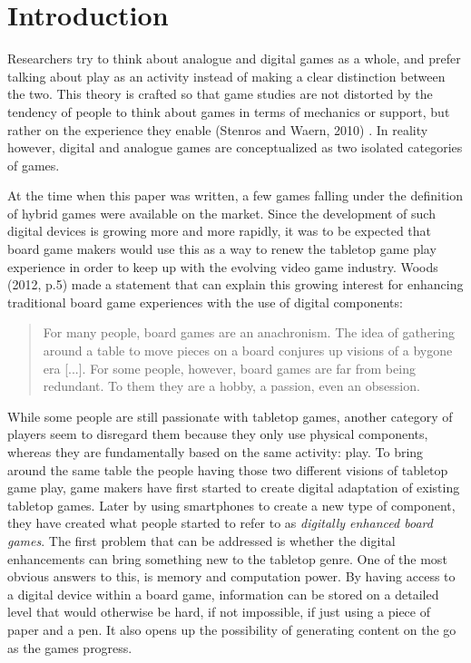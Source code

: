 \chapter{Introduction}
Researchers try to think about analogue and digital games as a whole, and prefer talking about play as an activity instead of making a clear distinction between the two. This theory is crafted so that game studies are not distorted by the tendency of people to think about games in terms of mechanics or support, but rather on the experience they enable (Stenros and Waern, 2010) \cite{art:stenroswaern}. In reality however, digital and analogue games are conceptualized as two isolated categories of games.

At the time when this paper was written, a few games falling under the definition of hybrid games were available on the market. Since the development of such digital devices is growing more and more rapidly, it was to be expected that board game makers would use this as a way to renew the tabletop game play experience in order to keep up with the evolving video game industry. Woods (2012, p.5) \cite{book:euro} made a statement that can explain this growing interest for enhancing traditional board game experiences with the use of digital components:

\begin{quotation}
For many people, board games are an anachronism. The idea of gathering around a table to move pieces on a board conjures up visions of a bygone era [...]. For some people, however, board games are far from being redundant. To them they are a hobby, a passion, even an obsession.
\end{quotation}

While some people are still passionate with tabletop games, another category of players seem to disregard them because they only use physical components, whereas they are fundamentally based on the same activity: play. To bring around the same table the people having those two different visions of tabletop game play, game makers have first started to create digital adaptation of existing tabletop games. Later by using smartphones to create a new type of component, they have created what people started to refer to as \textit{digitally enhanced board games}. The first problem that can be addressed is whether the digital enhancements can bring something new to the tabletop genre. One of the most obvious answers to this, is memory and computation power. By having access to a digital device within a board game, information can be stored on a detailed level that would otherwise be hard, if not impossible, if just using a piece of paper and a pen. 
It also opens up the possibility of generating content on the go as the games progress. 

